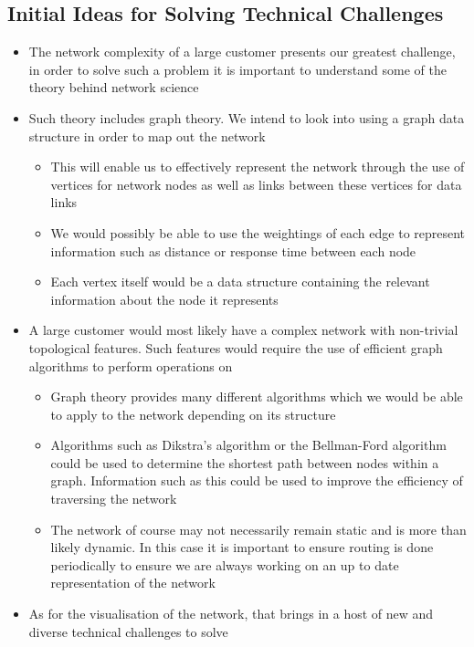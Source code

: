 \documentclass{article}
\begin{document}
	\subsection{Initial Ideas for Solving Technical Challenges}
		\begin{itemize}
			\item The network complexity of a large customer presents our greatest challenge, in order to solve such a problem it is important to understand some of the theory behind network science
			\item Such theory includes graph theory. We intend to look into using a graph data structure in order to map out the network
			\begin{itemize}
				\item This will enable us to effectively represent the network through the use of vertices for network nodes as well as links between these vertices for data links
				\item We would possibly be able to use the weightings of each edge to represent information such as distance or response time between each node
				\item Each vertex itself would be a data structure containing the relevant information about the node it represents
			\end{itemize}
			\item A large customer would most likely have a complex network with non-trivial topological features. Such features would require the use of efficient graph algorithms to perform operations on
			\begin{itemize}
				\item Graph theory provides many different algorithms which we would be able to apply to the network depending on its structure
				\item Algorithms such as Dikstra's algorithm or the Bellman-Ford algorithm could be used to determine the shortest path between nodes within a graph. Information such as this could be used to improve the efficiency of traversing the network
				\item The network of course may not necessarily remain static and is more than likely dynamic. In this case it is important to ensure routing is done periodically to ensure we are always working on an up to date representation of the network
			\end{itemize}
			\item As for the visualisation of the network, that brings in a host of new and diverse technical challenges to solve

\end{itemize}
\end{document}
